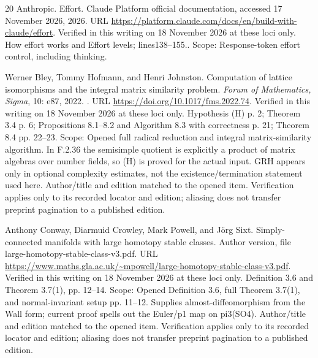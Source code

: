 \documentclass[11pt,a4paper]{article}
\theoremstyle{definition}
\begin{document}
\begin{thebibliography}{20}
{Anthropic}.
\newblock Effort.
\newblock Claude Platform official documentation, accessed 17 November 2026,
  2026.
\newblock URL
  \url{https://platform.claude.com/docs/en/build-with-claude/effort}.
\newblock Verified in this writing on 18 November 2026 at these loci only. How
  effort works and Effort levels;\allowbreak{} lines138–155.. Scope: Response-token effort
  control, including thinking.

Werner Bley, Tommy Hofmann, and Henri Johnston.
\newblock Computation of lattice isomorphisms and the integral matrix
  similarity problem.
\newblock \emph{Forum of Mathematics, Sigma}, 10: e87, 2022.
\newblock {}.
\newblock URL \url{https://doi.org/10.1017/fms.2022.74}.
\newblock Verified in this writing on 18 November 2026 at these loci only.
  Hypothesis (H) p. 2;\allowbreak{} Theorem 3.4 p. 6;\allowbreak{} Propositions 8.1–8.2 and Algorithm
  8.3 with correctness p. 21;\allowbreak{} Theorem 8.4 pp. 22–23. Scope: Opened full
  radical reduction and integral matrix-similarity algorithm. In F.2.36 the
  semisimple quotient is explicitly a product of matrix algebras over number
  fields, so (H) is proved for the actual input. GRH appears only in optional
  complexity estimates, not the existence/termination statement used here.
  Author/title and edition matched to the opened item. Verification applies
  only to its recorded locator and edition;\allowbreak{} aliasing does not transfer preprint
  pagination to a published edition.

Anthony Conway, Diarmuid Crowley, Mark Powell, and J{\"o}rg Sixt.
\newblock Simply-connected manifolds with large homotopy stable classes.
\newblock Author version, file large-homotopy-stable-class-v3.pdf.
\newblock URL
  \url{https://www.maths.gla.ac.uk/~mpowell/large-homotopy-stable-class-v3.pdf}.
\newblock Verified in this writing on 18 November 2026 at these loci only.
  Definition 3.6 and Theorem 3.7(1), pp. 12–14. Scope: Opened Definition 3.6,
  full Theorem 3.7(1), and normal-invariant setup pp. 11–12. Supplies
  almost-diffeomorphism from the Wall form;\allowbreak{} current proof spells out the
  Euler/p1 map on pi3(SO4). Author/title and edition matched to the opened
  item. Verification applies only to its recorded locator and edition;\allowbreak{} aliasing
  does not transfer preprint pagination to a published edition.


\end{thebibliography}
\end{document}
